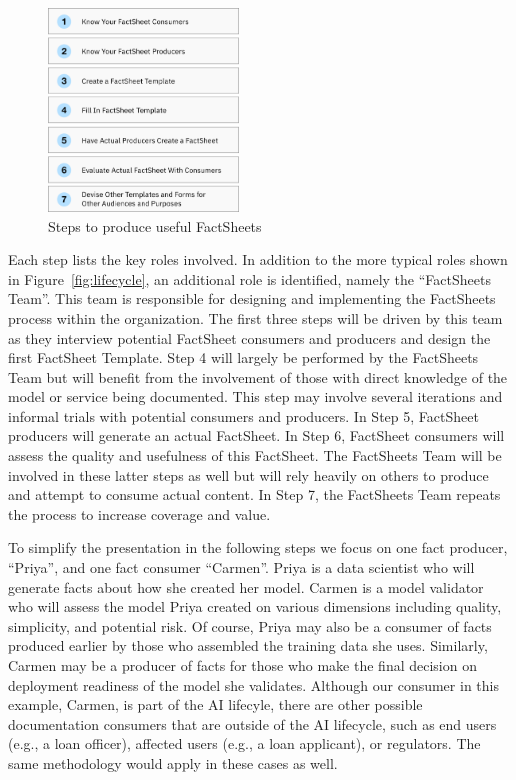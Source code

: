\documentclass[11pt,dvipdfm]{article}
\begin{document}
\begin{figure}
    \centering
    \includegraphics[width=0.45\textwidth]{figs/Img2_Steps.eps}
    \caption{Steps to produce useful FactSheets}
    \label{fig:flowchart}
\end{figure}

Each step lists the key roles involved. In addition to the more typical roles shown in Figure~\ref{fig:lifecycle}, an additional role is identified, namely the ``FactSheets Team''. This team is responsible for designing and implementing the FactSheets process within the organization. The first three steps will be driven by this team as they interview potential FactSheet consumers and producers and design the first FactSheet Template. Step 4 will largely be performed by the FactSheets Team but will benefit from the involvement of those with direct knowledge of the model or service being documented. This step may involve several iterations and informal trials with potential consumers and producers. In Step 5, FactSheet producers will generate an actual FactSheet. In Step 6, FactSheet consumers will assess the quality and usefulness of this FactSheet. The FactSheets Team will be involved in these latter steps as well but will rely heavily on others to produce and attempt to consume actual content. In Step 7, the FactSheets Team repeats the process to increase coverage and value.

To simplify the presentation in the following steps we focus on one fact producer, ``Priya'', and one fact consumer ``Carmen''. Priya is a data scientist who will generate facts about how she created her model. Carmen is a model validator who will assess the model Priya created on various dimensions including quality, simplicity, and potential risk. Of course, Priya may also be a consumer of facts produced earlier by those who assembled the training data she uses. Similarly, Carmen may be a producer of facts for those who make the final decision on deployment readiness of the model she validates.
Although our consumer in this example, Carmen, is part of the AI lifecyle, there are other possible documentation consumers that are outside of the AI lifecycle, such as end users (e.g., a loan officer), affected users (e.g., a loan applicant), or regulators.  The same methodology would apply in these cases as well.
\end{document}
